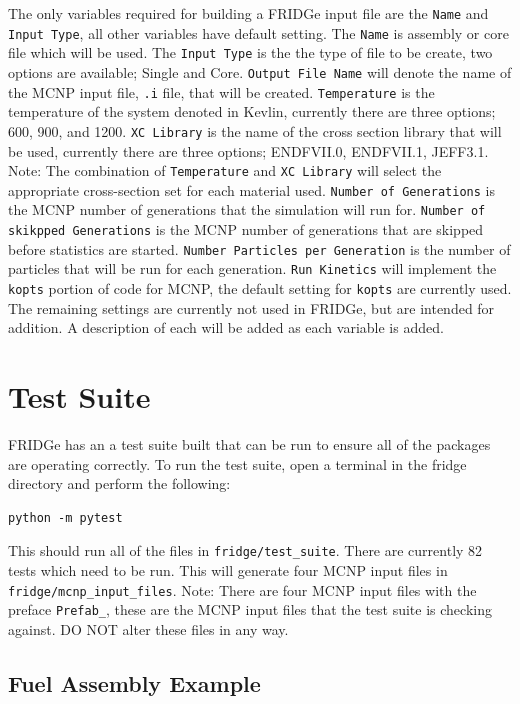 \documentclass{article}
\begin{document}
The only variables required for building a FRIDGe input file are the \verb|Name| and \verb|Input Type|, all other variables have default setting. The \verb|Name| is assembly or core file which will be used. The \verb|Input Type| is the the type of file to be create, two options are available; Single and Core. \verb|Output File Name| will denote the name of the MCNP input file, \verb|.i| file, that will be created. \verb|Temperature| is the temperature of the system denoted in Kevlin, currently there are three options; 600, 900, and 1200. \verb|XC Library| is the name of the cross section library that will be used, currently there are three options; ENDFVII.0, ENDFVII.1, JEFF3.1. Note: The combination of \verb|Temperature| and \verb|XC Library| will select the appropriate cross-section set for each material used. \verb|Number of Generations| is the MCNP number of generations that the simulation will run for. \verb|Number of skikpped Generations| is the MCNP number of generations that are skipped before statistics are started. \verb|Number Particles per Generation| is the number of particles that will be run for each generation. \verb|Run Kinetics| will implement the \verb|kopts| portion of code for MCNP, the default setting for \verb|kopts| are currently used. The remaining settings are currently not used in FRIDGe, but are intended for addition. A description of each will be added as each variable is added.

\section{Test Suite}

FRIDGe has an a test suite built that can be run to ensure all of the packages are operating correctly. To run the test suite, open a terminal in the fridge directory and perform the following:

\begin{lstlisting}
python -m pytest
\end{lstlisting}

This should run all of the files in \verb|fridge/test_suite|. There are currently 82 tests which need to be run. This will generate four MCNP input files in \verb|fridge/mcnp_input_files|. Note: There are four MCNP input files with the preface \verb|Prefab_|, these are the MCNP input files that the test suite is checking against. DO NOT alter these files in any way.

\subsection{Fuel Assembly Example}
\end{document}
